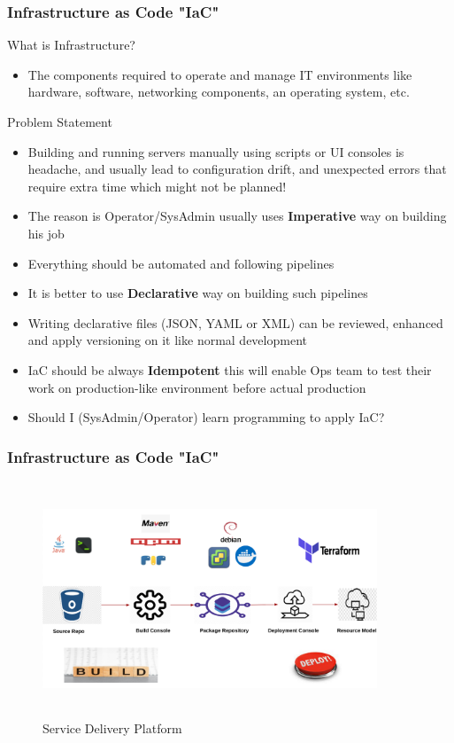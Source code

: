 \documentclass{beamer}
\begin{document}
	\begin{frame}
		\frametitle{Infrastructure as Code \textbf{"IaC"}}
		What is Infrastructure?
		\begin{itemize}
			\item<1->[] \scriptsize{The components required to operate and manage IT environments like  hardware, software, networking components, an operating system, etc.}
		\end{itemize}
		
		Problem Statement
		\begin{itemize}
			\item<1->[] \scriptsize{Building and running servers manually using scripts or UI consoles is headache, and usually lead to configuration drift, and unexpected errors that require extra time which might not be planned!}
			\vspace{1mm}
			\item<2-> \scriptsize{The reason is Operator/SysAdmin usually uses \textbf{Imperative} way on building his job}
			\item<3-> \scriptsize{Everything should be automated and following pipelines}
			\item<4-> \scriptsize{It is better to use \textbf{Declarative} way on building such pipelines}
			\item<5-> \scriptsize{Writing declarative files (JSON, YAML or XML) can be reviewed, enhanced and  apply versioning on it like normal development}
			\item<6-> \scriptsize{IaC should be always \textbf{Idempotent} this will enable Ops team to test their work on production-like environment before actual production}
			\item<7-> \scriptsize{Should I (SysAdmin/Operator) learn programming to apply IaC?}
		\end{itemize}
	\vspace{100mm}
	\end{frame}

	\begin{frame}
		\frametitle{Infrastructure as Code \textbf{"IaC"}}
			\begin{figure}[h]
				\includegraphics[width=100mm,height= 70mm, scale=1]{img/service-delivery-platform.png}
				\caption{Service Delivery Platform}
			\end{figure}
	\end{frame}
\end{document}
